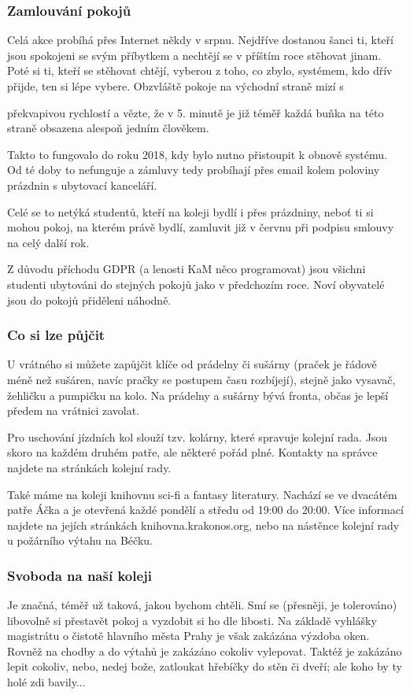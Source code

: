 \subsubsection{Zamlouvání pokojů}
Celá akce probíhá přes Internet někdy v srpnu. Nejdříve dostanou šanci ti,
kteří jsou spokojeni se svým příbytkem a nechtějí se v příštím roce stěhovat jinam.
Poté si ti, kteří se stěhovat chtějí, vyberou z toho, co zbylo, systémem, kdo
dřív přijde, ten si lépe vybere. Obzvláště pokoje na východní straně mizí s

překvapivou rychlostí a vězte, že v 5. minutě je již téměř každá buňka na této
straně obsazena alespoň jedním člověkem. 

Takto to fungovalo do roku 2018, kdy bylo nutno přistoupit k obnově systému. Od té doby to nefunguje a zámluvy tedy probíhají přes email kolem poloviny prázdnin s ubytovací kanceláří.

Celé se to netýká studentů, kteří na koleji bydlí i přes prázdniny, neboť
ti si
mohou pokoj, na kterém právě bydlí, zamluvit již v červnu při podpisu smlouvy na
celý další rok.

Z důvodu příchodu GDPR (a lenosti KaM něco programovat) jsou všichni studenti
ubytováni do stejných pokojů jako v předchozím roce. Noví obyvatelé jsou do
pokojů přiděleni náhodně.


\subsubsection{Co si lze půjčit}
U vrátného si můžete zapůjčit klíče od prádelny či sušárny (praček je řádově
méně než sušáren, navíc pračky se postupem času rozbíjejí), stejně jako vysavač,
žehličku a pumpičku na kolo. Na prádelny a sušárny bývá fronta, občas je lepší
předem na vrátnici zavolat.

Pro uschování jízdních kol slouží tzv. kolárny, které spravuje kolejní rada.
Jsou skoro na každém druhém patře, ale některé pořád plné. Kontakty na správce
najdete na stránkách kolejní rady.

Také máme na koleji knihovnu sci-fi a fantasy literatury. Nachází se ve dvacátém
patře Áčka a je otevřená každé pondělí a středu od 19:00 do 20:00. Více
informací najdete na jejích stránkách knihovna.krakonos.org, nebo na nástěnce
kolejní rady u požárního výtahu na Béčku.


\subsubsection{Svoboda na naší koleji}
Je značná, téměř už taková, jakou bychom chtěli. Smí se (přesněji, je
tolerováno) libovolně si přestavět pokoj a vyzdobit si ho dle libosti. Na
základě vyhlášky magistrátu o čistotě hlavního města Prahy je však zakázána
výzdoba oken. Rovněž na chodby a do výtahů je zakázáno cokoliv vylepovat. Taktéž
je zakázáno lepit cokoliv, nebo, nedej bože, zatloukat hřebíčky do stěn či
dveří; ale koho by ty holé zdi bavily...

